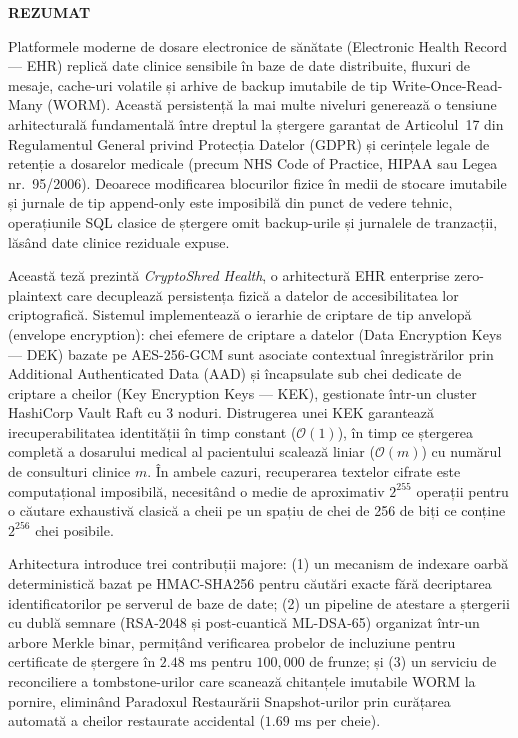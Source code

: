 \thispagestyle{abstractpagestyle}

\vspace*{24pt}

\begin{center}
    \textbf{\fontsize{18pt}{22pt} \selectfont REZUMAT}
\end{center}

\vspace{16pt}

Platformele moderne de dosare electronice de sănătate (Electronic Health Record --- EHR) replică date clinice sensibile în baze de date distribuite, fluxuri de mesaje, cache-uri volatile și arhive de backup imutabile de tip Write-Once-Read-Many (WORM). Această persistență la mai multe niveluri generează o tensiune arhitecturală fundamentală între dreptul la ștergere garantat de Articolul~17 din Regulamentul General privind Protecția Datelor (GDPR) și cerințele legale de retenție a dosarelor medicale (precum NHS Code of Practice, HIPAA sau Legea nr.~95/2006). Deoarece modificarea blocurilor fizice în medii de stocare imutabile și jurnale de tip append-only este imposibilă din punct de vedere tehnic, operațiunile SQL clasice de ștergere omit backup-urile și jurnalele de tranzacții, lăsând date clinice reziduale expuse.

Această teză prezintă \textit{CryptoShred Health}, o arhitectură EHR enterprise zero-plaintext care decuplează persistența fizică a datelor de accesibilitatea lor criptografică. Sistemul implementează o ierarhie de criptare de tip anvelopă (envelope encryption): chei efemere de criptare a datelor (Data Encryption Keys --- DEK) bazate pe AES-256-GCM sunt asociate contextual înregistrărilor prin Additional Authenticated Data (AAD) și încapsulate sub chei dedicate de criptare a cheilor (Key Encryption Keys --- KEK), gestionate într-un cluster HashiCorp Vault Raft cu 3 noduri. Distrugerea unei KEK garantează irecuperabilitatea identității în timp constant ($\mathcal{O}(1)$), în timp ce ștergerea completă a dosarului medical al pacientului scalează liniar ($\mathcal{O}(m)$) cu numărul de consulturi clinice $m$. În ambele cazuri, recuperarea textelor cifrate este computațional imposibilă, necesitând o medie de aproximativ $2^{255}$ operații pentru o căutare exhaustivă clasică a cheii pe un spațiu de chei de 256 de biți ce conține $2^{256}$ chei posibile.

Arhitectura introduce trei contribuții majore: (1) un mecanism de indexare oarbă deterministică bazat pe HMAC-SHA256 pentru căutări exacte fără decriptarea identificatorilor pe serverul de baze de date; (2) un pipeline de atestare a ștergerii cu dublă semnare (RSA-2048 și post-cuantică ML-DSA-65) organizat într-un arbore Merkle binar, permițând verificarea probelor de incluziune pentru certificate de ștergere în $2.48\text{~ms}$ pentru $100{,}000$ de frunze; și (3) un serviciu de reconciliere a tombstone-urilor care scanează chitanțele imutabile WORM la pornire, eliminând Paradoxul Restaurării Snapshot-urilor prin curățarea automată a cheilor restaurate accidental ($1.69\text{~ms}$ per cheie).

